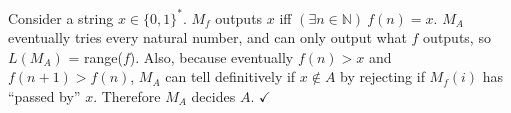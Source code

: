 \documentclass[11pt]{article}
\begin{document}
Consider a string $x \in \{0,1\}^*$.
$M_f$ outputs $x$ iff $(\exists n \in \mathbb{N})\ f(n) = x$.
$M_A$ eventually tries every natural number, and can only output what $f$ outputs, so $L(M_A)$ = range($f$).
Also, because eventually $f(n) > x$ and $f(n+1) > f(n)$, $M_A$ can tell definitively if $x \notin A$ by rejecting if $M_f(i)$ has ``passed by'' $x$.
Therefore $M_A$ decides $A$. $\checkmark$
\end{document}
